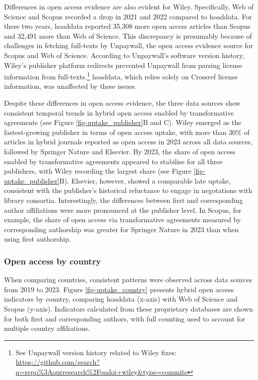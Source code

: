 \documentclass[a4paper,man,floatsintext,longtable,noextraspace,10pt]{apa6}
\begin{document}
Differences in open access evidence are also evident for Wiley.
Specifically, Web of Science and Scopus recorded a drop in 2021 and 2022
compared to hoaddata. For these two years, hoaddata reported 35,308 more
open access articles than Scopus and 32,491 more than Web of Science.
This discrepancy is presumably because of challenges in fetching
full-texts by Unpaywall, the open access evidence source for Scopus and
Web of Science. According to Unpaywall's software version history,
Wiley's publisher platform redirects prevented Unpaywall from parsing
license information from full-texts.\footnote{See Unpaywall version
  history related to Wiley fixes:
  \url{https://github.com/search?q=repo\%3Aourresearch\%2Foadoi+wiley&type=commits}}
hoaddata, which relies solely on Crossref license information, was
unaffected by these issues.

Despite these differences in open access evidence, the three data
sources show consistent temporal trends in hybrid open access enabled by
transformative agreements (see Figure \ref{fig-uptake_publisher}B and
C). Wiley emerged as the fastest-growing publisher in terms of open
access uptake, with more than 30\% of articles in hybrid journals
reported as open access in 2023 across all data sources, followed by
Springer Nature and Elsevier. By 2023, the share of open access enabled
by transformative agreements appeared to stabilise for all three
publishers, with Wiley recording the largest share (see Figure
\ref{fig-uptake_publisher}B). Elsevier, however, showed a comparable
late uptake, consistent with the publisher's historical reluctance to
engage in negotations with library consortia. Interestingly, the
differences between first and corresponding author affiliations were
more pronounced at the publisher level. In Scopus, for example, the
share of open access via transformative agreements measured by
corresponding authorship was greater for Springer Nature in 2023 than
when using first authorship.

\subsubsection{Open access by country}\label{open-access-by-country}

When comparing countries, consistent patterns were observed across data
sources from 2019 to 2023. Figure \ref{fig-uptake_country} presents
hybrid open access indicators by country, comparing hoaddata (x-axis)
with Web of Science and Scopus (y-axis). Indicators calculated from
these proprietary databases are shown for both first and corresponding
authors, with full counting used to account for multiple country
affiliations.
\end{document}

